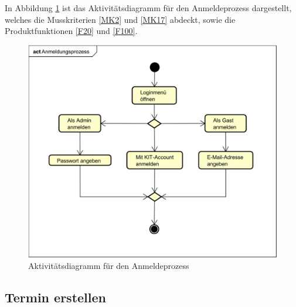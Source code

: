 In Abbildung \ref{fig:activity_diagram_login} ist das Aktivitätsdiagramm für den Anmeldeprozess dargestellt,
welches die Musskriterien \ref{MK2} und \ref{MK17} abdeckt, sowie die Produktfunktionen \ref{F20} und \ref{F100}.
\begin{figure}[ht]
    \centering
    \includegraphics[width=\textwidth]{figures/activitydiagrams/anmeldeprozess}
    \caption{Aktivitätsdiagramm für den Anmeldeprozess}
    \label{fig:activity_diagram_login}
\end{figure}
\clearpage
\subsection{Termin erstellen}

